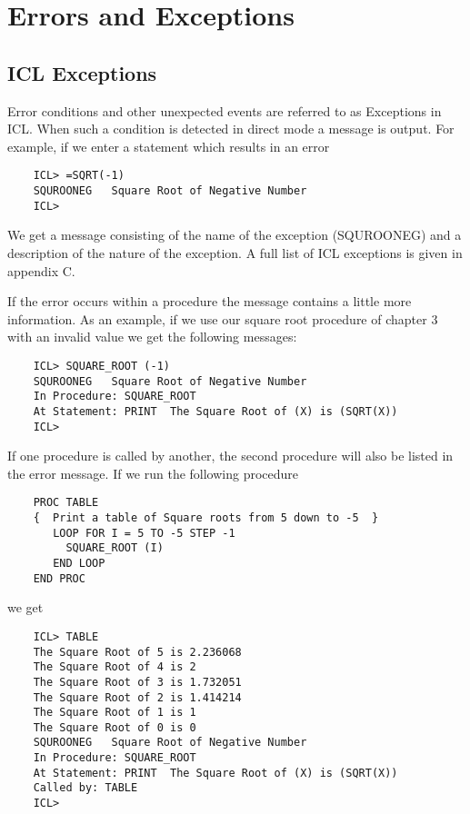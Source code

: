 \documentclass[twoside,11pt]{report}
\newcommand{\xlabel}[1]{}
\begin{document}
\chapter{\xlabel{errors_and_exceptions}Errors and Exceptions}

\section{\xlabel{icl_exceptions}ICL Exceptions}

Error conditions and other unexpected events are referred to as Exceptions
in ICL. When such a condition is detected in direct mode a message is 
output. For example, if we enter a statement which results in an error
\begin{verbatim}
    ICL> =SQRT(-1)
    SQUROONEG   Square Root of Negative Number
    ICL>
\end{verbatim}

We get a message consisting of the name of the exception (SQUROONEG) and
a description of the nature of the exception. A full list of ICL
exceptions is given in appendix C.

If the error occurs within a procedure the message contains a little
more information. As an example, if we use our square root procedure of
chapter 3 with an invalid value we get the following messages:
\begin{verbatim}
    ICL> SQUARE_ROOT (-1)
    SQUROONEG   Square Root of Negative Number
    In Procedure: SQUARE_ROOT
    At Statement: PRINT  The Square Root of (X) is (SQRT(X))
    ICL>
\end{verbatim}

If one procedure is called by another, the second procedure will also
be listed in the error message. If we run the following procedure

\begin{verbatim}
    PROC TABLE
    {  Print a table of Square roots from 5 down to -5  }
       LOOP FOR I = 5 TO -5 STEP -1
         SQUARE_ROOT (I)
       END LOOP
    END PROC
\end{verbatim}

we get

\begin{verbatim}
    ICL> TABLE
    The Square Root of 5 is 2.236068
    The Square Root of 4 is 2
    The Square Root of 3 is 1.732051
    The Square Root of 2 is 1.414214
    The Square Root of 1 is 1
    The Square Root of 0 is 0
    SQUROONEG   Square Root of Negative Number
    In Procedure: SQUARE_ROOT
    At Statement: PRINT  The Square Root of (X) is (SQRT(X))
    Called by: TABLE
    ICL>
\end{verbatim}
\end{document}
